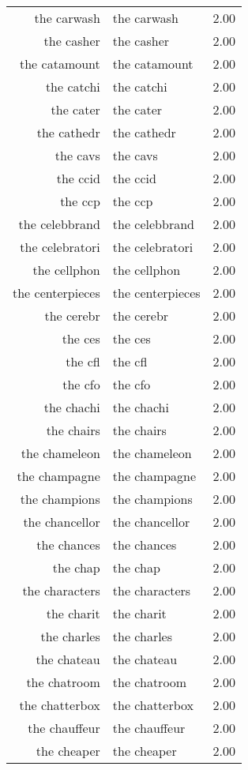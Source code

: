 \begin{table}[ht]
\begin{tabular}{rlr}
  the carwash & the carwash & 2.00 \\ 
  the casher & the casher & 2.00 \\ 
  the catamount & the catamount & 2.00 \\ 
  the catchi & the catchi & 2.00 \\ 
  the cater & the cater & 2.00 \\ 
  the cathedr & the cathedr & 2.00 \\ 
  the cavs & the cavs & 2.00 \\ 
  the ccid & the ccid & 2.00 \\ 
  the ccp & the ccp & 2.00 \\ 
  the celebbrand & the celebbrand & 2.00 \\ 
  the celebratori & the celebratori & 2.00 \\ 
  the cellphon & the cellphon & 2.00 \\ 
  the centerpieces & the centerpieces & 2.00 \\ 
  the cerebr & the cerebr & 2.00 \\ 
  the ces & the ces & 2.00 \\ 
  the cfl & the cfl & 2.00 \\ 
  the cfo & the cfo & 2.00 \\ 
  the chachi & the chachi & 2.00 \\ 
  the chairs & the chairs & 2.00 \\ 
  the chameleon & the chameleon & 2.00 \\ 
  the champagne & the champagne & 2.00 \\ 
  the champions & the champions & 2.00 \\ 
  the chancellor & the chancellor & 2.00 \\ 
  the chances & the chances & 2.00 \\ 
  the chap & the chap & 2.00 \\ 
  the characters & the characters & 2.00 \\ 
  the charit & the charit & 2.00 \\ 
  the charles & the charles & 2.00 \\ 
  the chateau & the chateau & 2.00 \\ 
  the chatroom & the chatroom & 2.00 \\ 
  the chatterbox & the chatterbox & 2.00 \\ 
  the chauffeur & the chauffeur & 2.00 \\ 
  the cheaper & the cheaper & 2.00 \\ 

\end{tabular}
\end{table}

